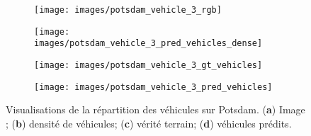\begin{figure}[t]
  \centering
  \begin{subfigure}{0.34\textwidth}
    \texttt{[image: images/potsdam\_vehicle\_3\_rgb]}
    \caption{}
  \end{subfigure}
  \hspace{0.1\textwidth}
  \begin{subfigure}{0.34\textwidth}
    \texttt{[image: images/potsdam\_vehicle\_3\_pred\_vehicles\_dense]}
    \caption{}
  \end{subfigure}
  \begin{subfigure}{0.34\textwidth}
    \texttt{[image: images/potsdam\_vehicle\_3\_gt\_vehicles]}
    \caption{}
  \end{subfigure}
  \hspace{0.1\textwidth}
  \begin{subfigure}{0.34\textwidth}
    \texttt{[image: images/potsdam\_vehicle\_3\_pred\_vehicles]}
    \caption{}
  \end{subfigure}\vspace{-12pt}

  \caption{Visualisations de la répartition des véhicules sur Potsdam. (\textbf{a}) Image ; (\textbf{b}) densité de véhicules; (\textbf{c}) vérité terrain; (\textbf{d}) véhicules prédits.}
  \label{fig:vehicle_density_maps}
\end{figure}
